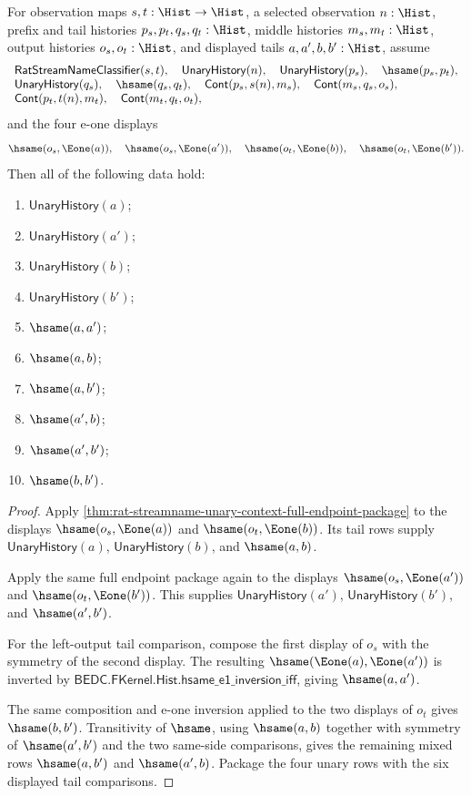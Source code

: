 \begin{theorem}
\label{thm:rat-streamname-unary-context-e1-tail-determinacy}
For observation maps $s,t:\Hist\to\Hist$, a selected observation $n:\Hist$,
prefix and tail histories $p_s,p_t,q_s,q_t:\Hist$, middle histories
$m_s,m_t:\Hist$, output histories $o_s,o_t:\Hist$, and displayed tails
$a,a',b,b':\Hist$, assume
$$
\begin{array}{l}
\mathsf{RatStreamNameClassifier}(s,t),\quad
\mathsf{UnaryHistory}(n),\quad
\mathsf{UnaryHistory}(p_s),\quad
\hsame(p_s,p_t),\\
\mathsf{UnaryHistory}(q_s),\quad
\hsame(q_s,q_t),\quad
\mathsf{Cont}(p_s,s(n),m_s),\quad
\mathsf{Cont}(m_s,q_s,o_s),\\
\mathsf{Cont}(p_t,t(n),m_t),\quad
\mathsf{Cont}(m_t,q_t,o_t),
\end{array}
$$
and the four e-one displays
$$
\hsame(o_s,\Eone(a)),\quad
\hsame(o_s,\Eone(a')),\quad
\hsame(o_t,\Eone(b)),\quad
\hsame(o_t,\Eone(b')).
$$
Then all of the following data hold:
\begin{enumerate}
\item $\mathsf{UnaryHistory}(a)$;
\item $\mathsf{UnaryHistory}(a')$;
\item $\mathsf{UnaryHistory}(b)$;
\item $\mathsf{UnaryHistory}(b')$;
\item $\hsame(a,a')$;
\item $\hsame(a,b)$;
\item $\hsame(a,b')$;
\item $\hsame(a',b)$;
\item $\hsame(a',b')$;
\item $\hsame(b,b')$.
\end{enumerate}
\end{theorem}
\begin{proof}
Apply
\autoref{thm:rat-streamname-unary-context-full-endpoint-package}
to the displays $\hsame(o_s,\Eone(a))$ and $\hsame(o_t,\Eone(b))$.
Its tail rows supply $\mathsf{UnaryHistory}(a)$,
$\mathsf{UnaryHistory}(b)$, and $\hsame(a,b)$.

Apply the same full endpoint package again to the displays
$\hsame(o_s,\Eone(a'))$ and $\hsame(o_t,\Eone(b'))$. This supplies
$\mathsf{UnaryHistory}(a')$, $\mathsf{UnaryHistory}(b')$, and
$\hsame(a',b')$.

For the left-output tail comparison, compose the first display of $o_s$ with
the symmetry of the second display. The resulting
$\hsame(\Eone(a),\Eone(a'))$ is inverted by
$\mathsf{BEDC.FKernel.Hist.hsame\_e1\_inversion\_iff}$, giving
$\hsame(a,a')$.

The same composition and e-one inversion applied to the two displays of $o_t$
gives $\hsame(b,b')$. Transitivity of $\hsame$, using $\hsame(a,b)$ together
with symmetry of $\hsame(a',b')$ and the two same-side comparisons, gives the
remaining mixed rows $\hsame(a,b')$ and $\hsame(a',b)$. Package the four
unary rows with the six displayed tail comparisons.
\end{proof}

